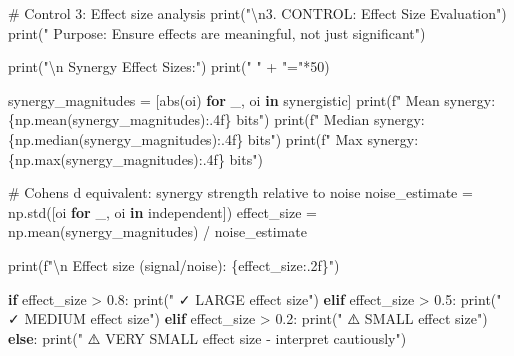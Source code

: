 \documentclass[
  11pt,
  letterpaper,
  oneside,
  openany]{book}
\newenvironment{Shaded}{\begin{snugshade}}{\end{snugshade}}
\newcommand{\BuiltInTok}[1]{\textcolor[rgb]{0.00,0.23,0.31}{#1}}
\newcommand{\CharTok}[1]{\textcolor[rgb]{0.13,0.47,0.30}{#1}}
\newcommand{\CommentTok}[1]{\textcolor[rgb]{0.37,0.37,0.37}{#1}}
\newcommand{\ControlFlowTok}[1]{\textcolor[rgb]{0.00,0.23,0.31}{\textbf{#1}}}
\newcommand{\DecValTok}[1]{\textcolor[rgb]{0.68,0.00,0.00}{#1}}
\newcommand{\FloatTok}[1]{\textcolor[rgb]{0.68,0.00,0.00}{#1}}
\newcommand{\KeywordTok}[1]{\textcolor[rgb]{0.00,0.23,0.31}{\textbf{#1}}}
\newcommand{\NormalTok}[1]{\textcolor[rgb]{0.00,0.23,0.31}{#1}}
\newcommand{\OperatorTok}[1]{\textcolor[rgb]{0.37,0.37,0.37}{#1}}
\newcommand{\SpecialCharTok}[1]{\textcolor[rgb]{0.37,0.37,0.37}{#1}}
\newcommand{\SpecialStringTok}[1]{\textcolor[rgb]{0.13,0.47,0.30}{#1}}
\newcommand{\StringTok}[1]{\textcolor[rgb]{0.13,0.47,0.30}{#1}}
\begin{document}
\begin{Shaded}
\begin{Highlighting}[]
\CommentTok{\# Control 3: Effect size analysis}
\BuiltInTok{print}\NormalTok{(}\StringTok{"}\CharTok{\textbackslash{}n}\StringTok{3. CONTROL: Effect Size Evaluation"}\NormalTok{)}
\BuiltInTok{print}\NormalTok{(}\StringTok{"   Purpose: Ensure effects are meaningful, not just significant"}\NormalTok{)}

\BuiltInTok{print}\NormalTok{(}\StringTok{"}\CharTok{\textbackslash{}n}\StringTok{   Synergy Effect Sizes:"}\NormalTok{)}
\BuiltInTok{print}\NormalTok{(}\StringTok{"   "} \OperatorTok{+} \StringTok{"="}\OperatorTok{*}\DecValTok{50}\NormalTok{)}

\NormalTok{synergy\_magnitudes }\OperatorTok{=}\NormalTok{ [}\BuiltInTok{abs}\NormalTok{(oi) }\ControlFlowTok{for}\NormalTok{ \_, oi }\KeywordTok{in}\NormalTok{ synergistic]}
\BuiltInTok{print}\NormalTok{(}\SpecialStringTok{f"   Mean synergy: }\SpecialCharTok{\{}\NormalTok{np}\SpecialCharTok{.}\NormalTok{mean(synergy\_magnitudes)}\SpecialCharTok{:.4f\}}\SpecialStringTok{ bits"}\NormalTok{)}
\BuiltInTok{print}\NormalTok{(}\SpecialStringTok{f"   Median synergy: }\SpecialCharTok{\{}\NormalTok{np}\SpecialCharTok{.}\NormalTok{median(synergy\_magnitudes)}\SpecialCharTok{:.4f\}}\SpecialStringTok{ bits"}\NormalTok{)}
\BuiltInTok{print}\NormalTok{(}\SpecialStringTok{f"   Max synergy: }\SpecialCharTok{\{}\NormalTok{np}\SpecialCharTok{.}\BuiltInTok{max}\NormalTok{(synergy\_magnitudes)}\SpecialCharTok{:.4f\}}\SpecialStringTok{ bits"}\NormalTok{)}

\CommentTok{\# Cohen\textquotesingle{}s d equivalent: synergy strength relative to noise}
\NormalTok{noise\_estimate }\OperatorTok{=}\NormalTok{ np.std([oi }\ControlFlowTok{for}\NormalTok{ \_, oi }\KeywordTok{in}\NormalTok{ independent])}
\NormalTok{effect\_size }\OperatorTok{=}\NormalTok{ np.mean(synergy\_magnitudes) }\OperatorTok{/}\NormalTok{ noise\_estimate}

\BuiltInTok{print}\NormalTok{(}\SpecialStringTok{f"}\CharTok{\textbackslash{}n}\SpecialStringTok{   Effect size (signal/noise): }\SpecialCharTok{\{}\NormalTok{effect\_size}\SpecialCharTok{:.2f\}}\SpecialStringTok{"}\NormalTok{)}

\ControlFlowTok{if}\NormalTok{ effect\_size }\OperatorTok{\textgreater{}} \FloatTok{0.8}\NormalTok{:}
    \BuiltInTok{print}\NormalTok{(}\StringTok{"   ✓ LARGE effect size"}\NormalTok{)}
\ControlFlowTok{elif}\NormalTok{ effect\_size }\OperatorTok{\textgreater{}} \FloatTok{0.5}\NormalTok{:}
    \BuiltInTok{print}\NormalTok{(}\StringTok{"   ✓ MEDIUM effect size"}\NormalTok{)}
\ControlFlowTok{elif}\NormalTok{ effect\_size }\OperatorTok{\textgreater{}} \FloatTok{0.2}\NormalTok{:}
    \BuiltInTok{print}\NormalTok{(}\StringTok{"   ⚠️  SMALL effect size"}\NormalTok{)}
\ControlFlowTok{else}\NormalTok{:}
    \BuiltInTok{print}\NormalTok{(}\StringTok{"   ⚠️  VERY SMALL effect size {-} interpret cautiously"}\NormalTok{)}


\end{Highlighting}
\end{Shaded}
\end{document}
